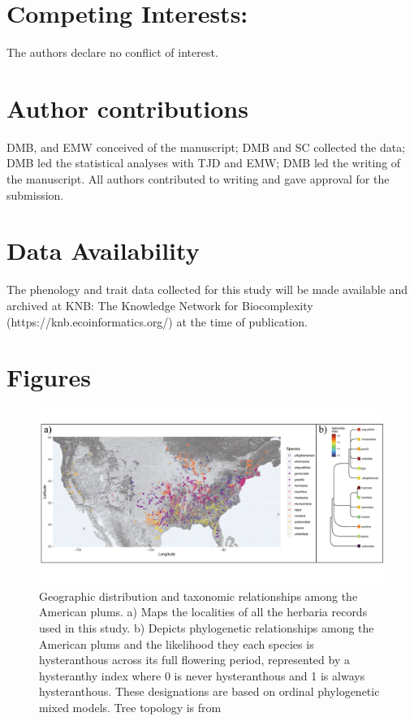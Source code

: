 \documentclass{article}[12pt]
\begin{document}
{{\section*{Competing Interests:}
The authors declare no conflict of interest.

\section*{Author contributions}
DMB, and EMW conceived of the manuscript; DMB and SC collected the data; DMB led the statistical analyses with TJD and EMW; DMB led the writing of the manuscript. All authors contributed to writing and gave approval for the submission.

\section*{Data Availability}
The phenology and trait data collected for this study will be made available and archived at KNB: The Knowledge Network for Biocomplexity (https://knb.ecoinformatics.org/) at the time of publication.

 

\newpage
\section*{Figures}


\begin{figure}[h!]
  \centering
 \includegraphics[width=\textwidth]{..//..//Plots/fig_1.png}
    \caption{Geographic distribution and taxonomic relationships among the American plums. a) Maps the localities of all the herbaria records used in this study. b) Depicts phylogenetic relationships among the American plums and the likelihood they each species is hysteranthous across its full flowering period, represented by a hysteranthy index where 0 is never hysteranthous and 1 is always hysteranthous. These designations are based on ordinal phylogenetic mixed models. Tree topology is from \citet{Shaw:2004aa}}
    \label{fig:phylo2}
\end{figure}



}}
\end{document}
